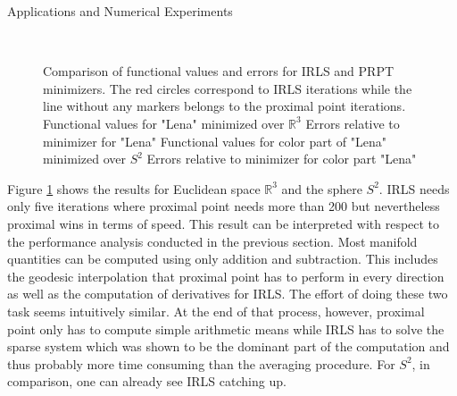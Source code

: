 \begin{chapter}{Applications and Numerical Experiments}
\begin{figure}[h!]
{    }\\
    \caption[Comparison IRLS \& PRPT for Euclidean $\mathbb{R}^3$ and $S^2$]{Comparison of functional values and errors for IRLS and PRPT minimizers.
	The red circles correspond to IRLS iterations while the line without any markers belongs to the proximal point iterations.
	 Functional values for "Lena" minimized over $\mathbb{R}^3$
	 Errors relative to minimizer for "Lena"
	 Functional values for color part of "Lena" minimized over $S^2$
	 Errors relative to minimizer for color part "Lena"
	\label{fig:comparison_euc_s2}
    }
\end{figure}

Figure \ref{fig:comparison_euc_s2} shows the results for Euclidean space $\mathbb{R}^3$ and the sphere $S^2$. IRLS needs only five iterations where proximal point needs more than 200
but nevertheless proximal wins in terms of speed. This result can be interpreted with respect to the performance analysis conducted in the previous section. Most manifold quantities can
be computed using only addition and subtraction. This includes the geodesic interpolation that proximal point has to perform in every direction as well as the computation of derivatives
for IRLS. The effort of doing these two task seems intuitively similar. At the end of that process, however, proximal point only has to compute simple arithmetic means while IRLS has to 
solve the sparse system which was shown to be the dominant part of the computation and thus probably more time consuming than the averaging procedure. For $S^2$, in comparison, one
can already see IRLS catching up.\\


\end{chapter}
